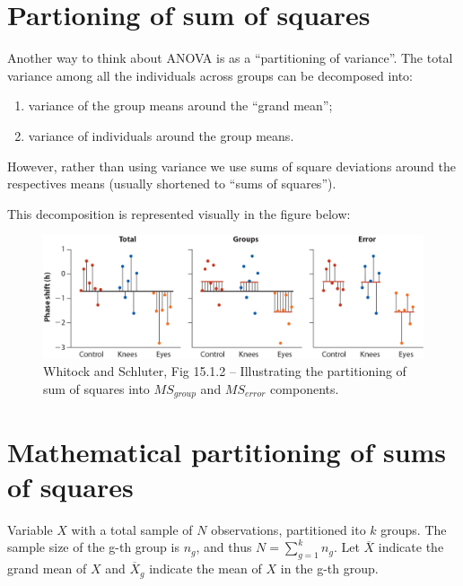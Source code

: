 \documentclass[]{book}
\theoremstyle{definition}
\theoremstyle{definition}
\theoremstyle{definition}
\theoremstyle{remark}
\begin{document}
\hypertarget{partioning-of-sum-of-squares}{%
\section{Partioning of sum of
squares}\label{partioning-of-sum-of-squares}}

Another way to think about ANOVA is as a ``partitioning of variance''.
The total variance among all the individuals across groups can be
decomposed into:

\begin{enumerate}
\def\labelenumi{\arabic{enumi})}
\item
  variance of the group means around the ``grand mean'';
\item
  variance of individuals around the group means.
\end{enumerate}

However, rather than using variance we use sums of square deviations
around the respectives means (usually shortened to ``sums of squares'').

This decomposition is represented visually in the figure below:

\begin{figure}

{\centering \includegraphics[width=0.9\linewidth]{./figures/whitlock_15.1-2} 

}

\caption{Whitock and Schluter, Fig 15.1.2 -- Illustrating the partitioning of sum of squares into $MS_{group}$ and $MS_{error}$ components. }\label{fig:unnamed-chunk-451}
\end{figure}

\hypertarget{mathematical-partitioning-of-sums-of-squares}{%
\section{Mathematical partitioning of sums of
squares}\label{mathematical-partitioning-of-sums-of-squares}}

Variable \(X\) with a total sample of \(N\) observations, partitioned
ito \(k\) groups. The sample size of the g-th group is \(n_g\), and thus
\(N = \sum_{g=1}^{k} n_g\). Let \(\overline{X}\) indicate the grand mean
of \(X\) and \(\overline{X}_g\) indicate the mean of \(X\) in the g-th
group.
\end{document}
